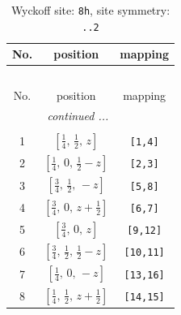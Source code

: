 \documentclass[fleqn,8pt]{jsarticle}
\begin{document}
\begin{longtable}{ccc}
\caption{Wyckoff site: {\tt 8h}, site symmetry: {\tt ..2}}
 \\
 \hline \hline
No. & position & mapping \\ \hline \endfirsthead

\multicolumn{2}{l}{\tablename\ \thetable{}} \\
 \hline \hline
No. & position & mapping \\ \hline \endhead

 \hline \hline
\multicolumn{2}{r}{\footnotesize\it continued ...} \\ \endfoot

 \hline \hline
\multicolumn{2}{r}{} \\ \endlastfoot

1 & $\left[ \frac{1}{4},\, \frac{1}{2},\, z \right]$ & {\tt [1,4]} \\ \hline
2 & $\left[ \frac{1}{4},\, 0,\, \frac{1}{2} - z \right]$ & {\tt [2,3]} \\ \hline
3 & $\left[ \frac{3}{4},\, \frac{1}{2},\, - z \right]$ & {\tt [5,8]} \\ \hline
4 & $\left[ \frac{3}{4},\, 0,\, z + \frac{1}{2} \right]$ & {\tt [6,7]} \\ \hline
5 & $\left[ \frac{3}{4},\, 0,\, z \right]$ & {\tt [9,12]} \\ \hline
6 & $\left[ \frac{3}{4},\, \frac{1}{2},\, \frac{1}{2} - z \right]$ & {\tt [10,11]} \\ \hline
7 & $\left[ \frac{1}{4},\, 0,\, - z \right]$ & {\tt [13,16]} \\ \hline
8 & $\left[ \frac{1}{4},\, \frac{1}{2},\, z + \frac{1}{2} \right]$ & {\tt [14,15]} \\
\end{longtable}
\renewcommand{\arraystretch}{1.2}
\end{document}
